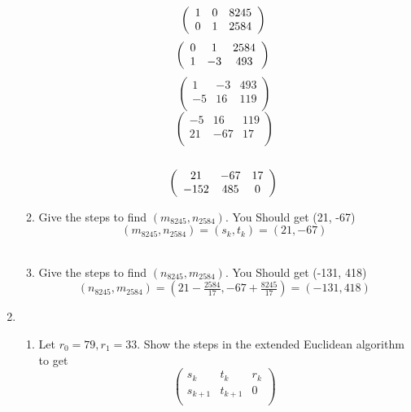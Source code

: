 \documentclass[11pt]{article}
\begin{document}
\begin{enumerate}
\begin{enumerate}
\begin{equation*}
\left(
\begin{array}{ccc}
 1 & 0 & 8245 \\
 0 & 1 & 2584 \\
\end{array}
\right)\\
\end{equation*}
\begin{equation*}
\left(
\begin{array}{ccc}
 0 & 1 & 2584 \\
 1 & -3 & 493 \\
\end{array}
\right)\\
\end{equation*}
\begin{equation*}
\left(
\begin{array}{ccc}
 1 & -3 & 493 \\
 -5 & 16 & 119 \\
\end{array}
\right)
\end{equation*}
\begin{equation*}
\left(
\begin{array}{ccc}
 -5 & 16 & 119 \\
 21 & -67 & 17 \\
\end{array}
\right)
\end{equation*}\\
\begin{equation*}
\left(
\begin{array}{ccc}
 21 & -67 & 17 \\
 -152 & 485 & 0 \\
\end{array}
\right)\\
\end{equation*}


\item Give the steps to find $(m_{8245}, n_{2584})$.  You Should get (21, -67)
\\
$$(m_{8245}, n_{2584})  = (s_k, t_k) = (21, -67)$$
\\
\item Give the steps to find $(n_{8245}, m_{2584})$.  You Should get (-131, 418)
\\
$$(n_{8245}, m_{2584}) = (21 - \tfrac{2584}{17}, -67 + \tfrac{8245}{17}) = (-131, 418)$$
\end{enumerate}


\newpage %
\item 
\begin{enumerate}
\item Let $r_0 = 79, r_1 = 33$.  Show the steps in the extended Euclidean algorithm to get
\begin{equation*}
\left(
\begin{array}{ccc}
s_k & t_k & r_k \\
s_{k+1} & t_{k+1} & 0 \\
\end{array} \right)
\end{equation*}


\end{enumerate}
\end{enumerate}
\end{document}
